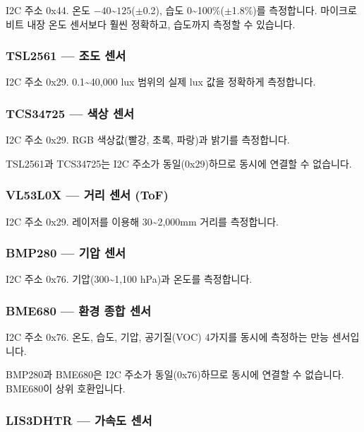 \documentclass[11pt, a4paper]{article}
\begin{document}
I2C 주소 0x44. 온도 $-40$\textasciitilde$125$\textcelsius($\pm$0.2\textcelsius), 습도 0\textasciitilde100\%($\pm$1.8\%)를 측정합니다. 마이크로비트 내장 온도 센서보다 훨씬 정확하고, 습도까지 측정할 수 있습니다.

\subsubsection{TSL2561 — 조도 센서}

I2C 주소 0x29. 0.1\textasciitilde40,000 lux 범위의 실제 lux 값을 정확하게 측정합니다.

\subsubsection{TCS34725 — 색상 센서}

I2C 주소 0x29. RGB 색상값(빨강, 초록, 파랑)과 밝기를 측정합니다.

\begin{warnbox}[주소 충돌 주의]
TSL2561과 TCS34725는 I2C 주소가 동일(0x29)하므로 동시에 연결할 수 없습니다.
\end{warnbox}

\subsubsection{VL53L0X — 거리 센서 (ToF)}

I2C 주소 0x29. 레이저를 이용해 30\textasciitilde2,000mm 거리를 측정합니다.

\subsubsection{BMP280 — 기압 센서}

I2C 주소 0x76. 기압(300\textasciitilde1,100 hPa)과 온도를 측정합니다.

\subsubsection{BME680 — 환경 종합 센서}

I2C 주소 0x76. 온도, 습도, 기압, 공기질(VOC) 4가지를 동시에 측정하는 만능 센서입니다.

\begin{warnbox}[주소 충돌 주의]
BMP280과 BME680은 I2C 주소가 동일(0x76)하므로 동시에 연결할 수 없습니다. BME680이 상위 호환입니다.
\end{warnbox}

\subsubsection{LIS3DHTR — 가속도 센서}
\end{document}
